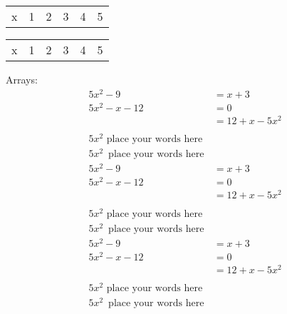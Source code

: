 \documentclass[11pt]{article}
\begin{document}
\begin{tabular}{|r|r|r|r|r|r|}
x & 1 & 2 & 3 & 4 & 5
\end{tabular}

\vspace{1cm}


\begin{tabular}{|l|l|l|l|l|l|}
x & 1 & 2 & 3 & 4 & 5
\end{tabular}

Arrays:
\begin{align}
5x^2-9&=x+3\\
5x^2-x-12&=0\\
&=12+x-5x^2\\\\
5x^2 \text{ place your words here }\\
5x^2\, \text{ place your words here}
\end{align}
\begin{align*}
5x^2-9&=x+3\\
5x^2-x-12&=0\\
&=12+x-5x^2\\\\
5x^2 \text{ place your words here }\\
5x^2\, \text{ place your words here}
\end{align*}
\begin{align}
5x^2-9&=x+3\\
5x^2-x-12&=0\\
&=12+x-5x^2\\\\
5x^2 \text{ place your words here }\\
5x^2\, \text{ place your words here}
\end{align}
\end{document}
